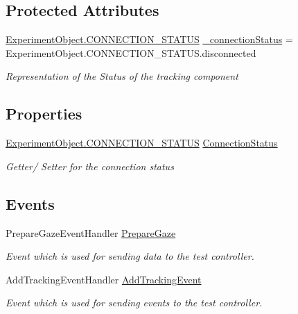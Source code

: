 \subsection*{Protected Attributes}
\begin{DoxyCompactItemize}
\item 
\hyperlink{class_web_analyzer_1_1_u_i_1_1_interaction_objects_1_1_experiment_object_a2875208b4f4b0ed643593152f4ec025c}{Experiment\+Object.\+C\+O\+N\+N\+E\+C\+T\+I\+O\+N\+\_\+\+S\+T\+A\+T\+U\+S} \hyperlink{class_web_analyzer_1_1_models_1_1_base_1_1_base_tracking_model_aecba61dd2b171d2f6dcf3abc40229d39}{\+\_\+connection\+Status} = Experiment\+Object.\+C\+O\+N\+N\+E\+C\+T\+I\+O\+N\+\_\+\+S\+T\+A\+T\+U\+S.\+disconnected
\begin{DoxyCompactList}\small\item\em Representation of the Status of the tracking component \end{DoxyCompactList}\end{DoxyCompactItemize}
\subsection*{Properties}
\begin{DoxyCompactItemize}
\item 
\hyperlink{class_web_analyzer_1_1_u_i_1_1_interaction_objects_1_1_experiment_object_a2875208b4f4b0ed643593152f4ec025c}{Experiment\+Object.\+C\+O\+N\+N\+E\+C\+T\+I\+O\+N\+\_\+\+S\+T\+A\+T\+U\+S} \hyperlink{class_web_analyzer_1_1_models_1_1_base_1_1_base_tracking_model_aea243d67939ea7e2e62adbdecc525026}{Connection\+Status}
\begin{DoxyCompactList}\small\item\em Getter/ Setter for the connection status \end{DoxyCompactList}\end{DoxyCompactItemize}
\subsection*{Events}
\begin{DoxyCompactItemize}
\item 
Prepare\+Gaze\+Event\+Handler \hyperlink{class_web_analyzer_1_1_models_1_1_base_1_1_base_tracking_model_acf17194aca2875e9f69c15772af39417}{Prepare\+Gaze}
\begin{DoxyCompactList}\small\item\em Event which is used for sending data to the test controller. \end{DoxyCompactList}\item 
Add\+Tracking\+Event\+Handler \hyperlink{class_web_analyzer_1_1_models_1_1_base_1_1_base_tracking_model_a3c003ad3cd3902810994f53409a6aeb7}{Add\+Tracking\+Event}
\begin{DoxyCompactList}\small\item\em Event which is used for sending events to the test controller. \end{DoxyCompactList}\end{DoxyCompactItemize}


